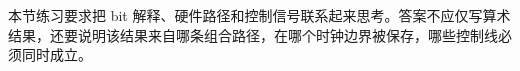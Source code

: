 本节练习要求把 bit 解释、硬件路径和控制信号联系起来思考。答案不应仅写算术结果，还要说明该结果来自哪条组合路径，在哪个时钟边界被保存，哪些控制线必须同时成立。











































































































































